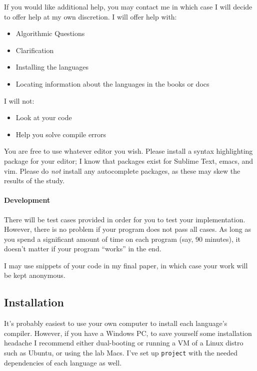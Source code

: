 If you would like additional help, you may contact me in which case I
will decide to offer help at my own discretion. I will offer help with:

\begin{itemize}
\itemsep1pt\parskip0pt
\item
  Algorithmic Questions
\item
  Clarification
\item
  Installing the languages
\item
  Locating information about the languages in the books or docs
\end{itemize}

I will not:

\begin{itemize}
\itemsep1pt\parskip0pt
\item
  Look at your code
\item
  Help you solve compile errors
\end{itemize}

You are free to use whatever editor you wish. Please install a syntax
highlighting package for your editor; I know that packages exist for
Sublime Text, emacs, and vim. Please do \emph{not} install any
autocomplete packages, as these may skew the results of the study.

\paragraph{Development}\label{development}

There will be test cases provided in order for you to test your
implementation. However, there is no problem if your program does not
pass all cases. As long as you spend a significant amount of time on
each program (say, 90 minutes), it doesn't matter if your program
``works'' in the end.

I may use snippets of your code in my final paper, in which case your
work will be kept anonymous.

\subsection{Installation}\label{installation}

It's probably easiest to use your own computer to install each
language's compiler. However, if you have a Windows PC, to save yourself
some installation headache I recommend either dual-booting or running a
VM of a Linux distro such as Ubuntu, or using the lab Macs. I've set up
\lstinline!project! with the needed dependencies of each language as
well.

